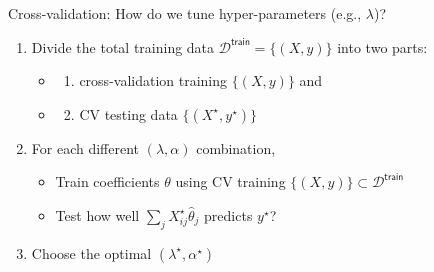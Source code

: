 \documentclass[
  ignorenonframetext,
  aspectratio=169]{beamer}
\providecommand{\tightlist}{%
  \setlength{\itemsep}{0pt}\setlength{\parskip}{0pt}}
\begin{document}
\begin{frame}{Cross-validation: How do we tune hyper-parameters (e.g.,
\(\lambda\))?}
\protect\hypertarget{cross-validation-how-do-we-tune-hyper-parameters-e.g.-lambda}{}
\begin{enumerate}
\item
  Divide the total training data
  \(\mathcal{D}^{\textsf{train}} = \{(X,y)\}\) into two parts:

  \begin{itemize}
  \item
    \begin{enumerate}
    [(1)]
    \tightlist
    \item
      cross-validation training \(\{(X,y)\}\) and
    \end{enumerate}
  \item
    \begin{enumerate}
    [(1)]
    \setcounter{enumii}{1}
    \tightlist
    \item
      CV testing data \(\{(X^\star,y^\star)\}\)
    \end{enumerate}
  \end{itemize}
\item
  For each different \((\lambda, \alpha)\) combination,

  \begin{itemize}
  \item
    Train coefficients \(\theta\) using CV training
    \(\{(X,y)\} \subset \mathcal{D}^{\textsf{train}}\)
  \item
    Test how well \(\sum_{j} X^{\star}_{ij} \hat{\theta}_{j}\) predicts
    \(y^\star\)?
  \end{itemize}
\item
  Choose the optimal \((\lambda^\star, \alpha^\star)\)
\end{enumerate}
\end{frame}
\end{document}
